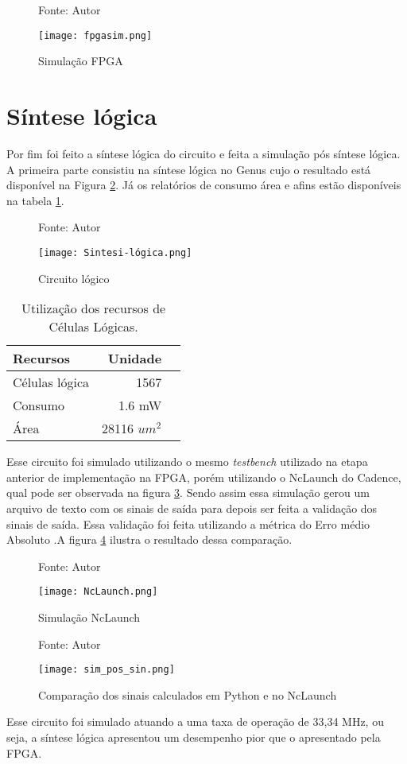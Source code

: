 \begin{figure}[ht!]
	\centering
	\captionsetup{justification=centering}
	\caption*{Fonte: Autor}
	\texttt{[image: fpgasim.png]}
	\caption{Simulação FPGA}
	\label{fig:simfpga}
\end{figure}


\section{Síntese lógica}
Por fim foi feito a síntese lógica do circuito e feita a simulação pós síntese lógica. A primeira parte consistiu na síntese lógica no Genus cujo o resultado está disponível na Figura \ref{fig:circuito_logico}. Já os relatórios de consumo área e afins estão disponíveis na tabela \ref{tab:recursos_sintese}. 

\begin{figure}[ht!]
	\centering
	\captionsetup{justification=centering}
	\caption*{Fonte: Autor}
	\texttt{[image: Sintesi-lógica.png]}
	\caption{Circuito lógico}
	\label{fig:circuito_logico}
\end{figure}

\begin{table}[h!]
	\centering
	\begin{tabular}{|l|r|r|}
		\hline
		Recursos & Unidade  \\
		\hline
        Células lógica & 1567  \\
		Consumo & 1.6 mW  \\
		Área & 28116 $um^2$  \\
		\hline
	\end{tabular}
	\caption{Utilização dos recursos de Células Lógicas.}
	\label{tab:recursos_sintese}
\end{table}

Esse circuito foi simulado utilizando o mesmo \textit{testbench} utilizado na etapa anterior de implementação na FPGA, porém utilizando o NcLaunch do Cadence, qual pode ser observada na figura \ref{fig:NcLaunch}. Sendo assim essa simulação gerou um arquivo de texto com os sinais de saída para depois ser feita a validação dos sinais de saída. Essa validação foi feita utilizando a métrica do Erro médio Absoluto .A figura \ref{fig:simpost} ilustra o resultado dessa comparação.


\begin{figure}[ht!]
	\centering
	\captionsetup{justification=centering}
	\caption*{Fonte: Autor}
	\texttt{[image: NcLaunch.png]}
	\caption{Simulação NcLaunch}
	\label{fig:NcLaunch}
\end{figure}


\begin{figure}[ht!]
	\centering
	\captionsetup{justification=centering}
	\caption*{Fonte: Autor}
	\texttt{[image: sim\_pos\_sin.png]}
	\caption{Comparação dos sinais calculados em Python e no NcLaunch} 
	\label{fig:simpost}
\end{figure}

Esse circuito foi simulado atuando a uma taxa de operação de 33,34 MHz, ou seja, a síntese lógica apresentou um desempenho pior que o apresentado pela FPGA. 